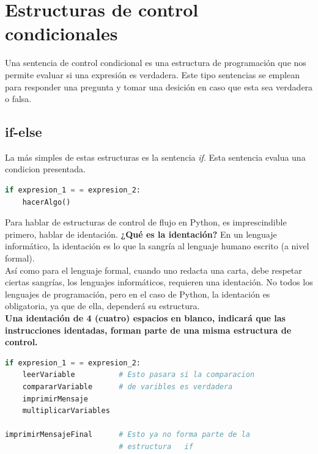 \documentclass[a4paper, openright, 12pt]{article}
\begin{document}
    \newpage{}




  \section{Estructuras de control condicionales}
    Una sentencia de control condicional es una estructura de programación que nos permite evaluar si una expresión es verdadera. Este tipo sentencias se emplean para responder una pregunta y tomar una desición en caso que esta sea verdadera o falsa.

    \subsection{if-else}
      La más simples de estas estructuras es la sentencia \textit{if}. Esta sentencia evalua una condicion presentada.\\

\begin{lstlisting}[language=Python]
if expresion_1 = = expresion_2:
    hacerAlgo()
\end{lstlisting}

    \vspace{0.15in}
    Para hablar de estructuras de control de flujo en Python, es imprescindible primero, hablar de identación. \textbf{¿Qué es la identación?} En un lenguaje informático, la identación es lo que la sangría al lenguaje humano escrito (a nivel formal).\\

    Así como para el lenguaje formal, cuando uno redacta una carta, debe respetar ciertas sangrías, los lenguajes informáticos, requieren una identación. No todos los lenguajes de programación, pero en el caso de Python, la identación es obligatoria, ya que de ella, dependerá su estructura.\\

    \textbf{Una identación de 4 (cuatro) espacios en blanco, indicará que las instrucciones identadas, forman parte de una misma estructura de control.}\\

\begin{lstlisting}[language=Python]
if expresion_1 = = expresion_2:
    leerVariable          # Esto pasara si la comparacion
    compararVariable      # de varibles es verdadera
    imprimirMensaje
    multiplicarVariables

imprimirMensajeFinal      # Esto ya no forma parte de la
                          # estructura   if
\end{lstlisting}
\end{document}
